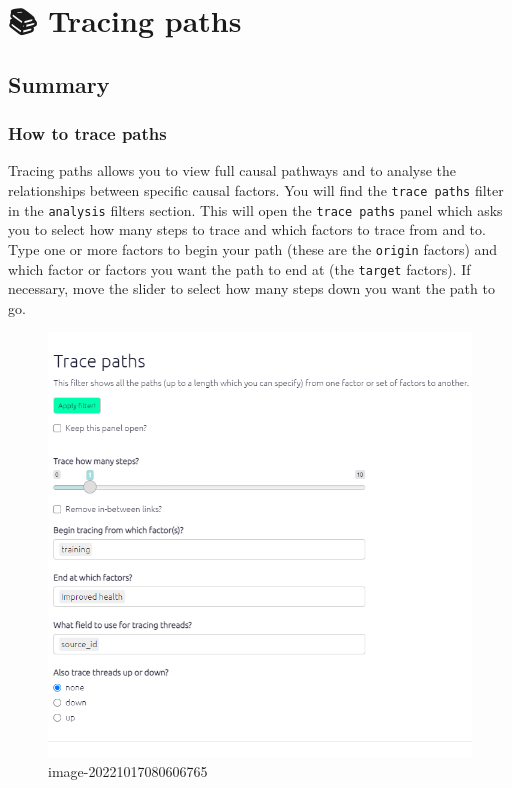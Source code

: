 \documentclass[
]{book}
\begin{document}
\hypertarget{xtracing-paths}{%
\chapter{📚 Tracing paths}\label{xtracing-paths}}

\hypertarget{summary-6}{%
\section{Summary}\label{summary-6}}

\hypertarget{howtotracepathsandrobustness}{%
\subsection{How to trace paths}\label{howtotracepathsandrobustness}}

Tracing paths allows you to view full causal pathways and to analyse the relationships between specific causal factors. You will find the \texttt{trace\ paths} filter in the \texttt{analysis} filters section. This will open the \texttt{trace\ paths} panel which asks you to select how many steps to trace and which factors to trace from and to. Type one or more factors to begin your path (these are the \texttt{origin} factors) and which factor or factors you want the path to end at (the \texttt{target} factors). If necessary, move the slider to select how many steps down you want the path to go.

\begin{figure}
\centering
\includegraphics{_assets/image-20221017080606765.png}
\caption{image-20221017080606765}
\end{figure}
\end{document}
